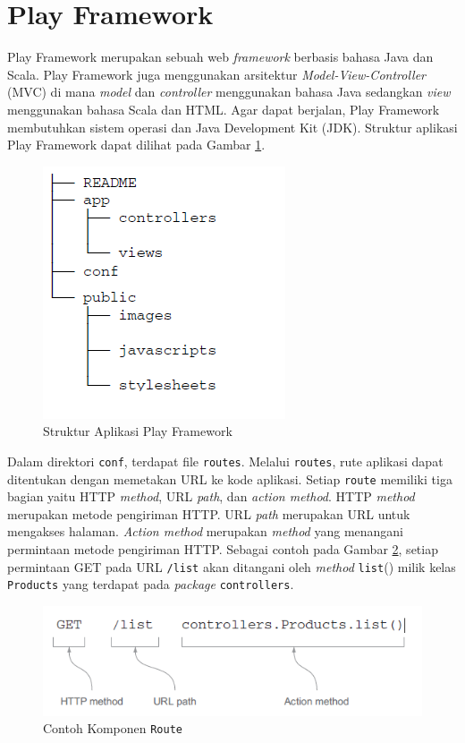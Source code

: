 \section{Play Framework}
\label{sec:play}

Play Framework\cite{Leroux:2014} merupakan sebuah web \textit{framework} berbasis bahasa Java dan Scala. Play Framework juga menggunakan arsitektur \textit{Model-View-Controller} (MVC) di mana \textit{model} dan \textit{controller} menggunakan bahasa Java sedangkan \textit{view} menggunakan bahasa Scala dan HTML. Agar dapat berjalan, Play Framework membutuhkan sistem operasi dan Java Development Kit (JDK). Struktur aplikasi Play Framework dapat dilihat pada Gambar \ref{fig:2_play_dir}.
\begin{figure}[H]
	\centering
	\includegraphics[scale=0.5]{Gambar/play-dir}
	\caption{Struktur Aplikasi Play Framework} 
	\label{fig:2_play_dir}
\end{figure}

Dalam direktori \texttt{conf}, terdapat file \texttt{routes}. Melalui \texttt{routes}, rute aplikasi dapat ditentukan dengan memetakan URL ke kode aplikasi. Setiap \texttt{route} memiliki tiga bagian yaitu HTTP \textit{method}, URL \textit{path}, dan \textit{action method}.  HTTP \textit{method} merupakan metode pengiriman HTTP. URL \textit{path} merupakan URL untuk mengakses halaman. \textit{Action method} merupakan \textit{method} yang menangani permintaan metode pengiriman HTTP. Sebagai contoh pada Gambar \ref{fig:2_routes_example}, setiap permintaan GET pada URL \texttt{/list} akan ditangani oleh \textit{method} \texttt{list}() milik kelas \texttt{Products} yang terdapat pada \textit{package} \texttt{controllers}.

\begin{figure}[H]
	\centering
	\includegraphics[scale=0.5]{Gambar/contoh-routes}
	\caption{Contoh Komponen \texttt{Route}\cite{Leroux:2014}} 
	\label{fig:2_routes_example}
\end{figure}

